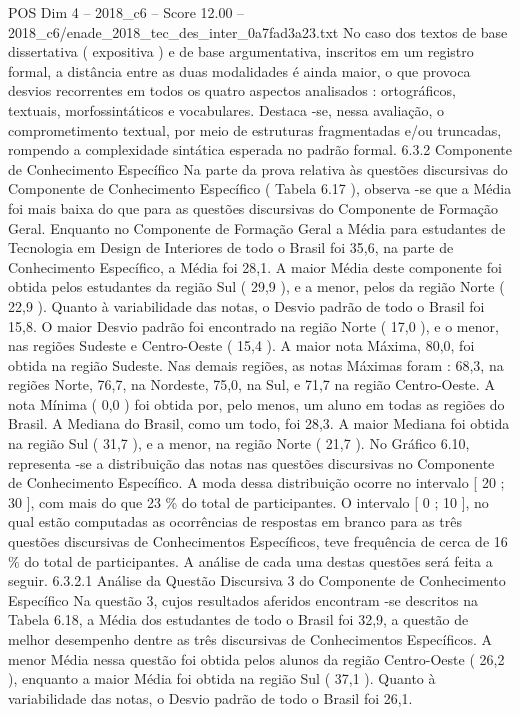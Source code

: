 \begin{textsample}{POS Dim 4 – 2018\_c6 – Score 12.00 – 2018\_c6/enade\_2018\_tec\_des\_inter\_0a7fad3a23.txt}
No caso dos textos de base dissertativa ( expositiva ) e de base argumentativa, inscritos em um registro formal, a distância entre as duas modalidades é ainda maior, o que provoca desvios recorrentes em todos os quatro aspectos analisados : ortográficos, textuais, morfossintáticos e vocabulares.
Destaca -se, nessa avaliação, o comprometimento textual, por meio de estruturas fragmentadas e/ou truncadas, rompendo a complexidade sintática esperada no padrão formal. 6.3.2 Componente de Conhecimento Específico Na parte da prova relativa às questões discursivas do Componente de Conhecimento Específico ( Tabela 6.17 ), observa -se que a Média foi mais baixa do que para as questões discursivas do Componente de Formação Geral.
Enquanto no Componente de Formação Geral a Média para estudantes de Tecnologia em Design de Interiores de todo o Brasil foi 35,6, na parte de Conhecimento Específico, a Média foi 28,1.
A maior Média deste componente foi obtida pelos estudantes da região Sul ( 29,9 ), e a menor, pelos da região Norte ( 22,9 ).
Quanto à variabilidade das notas, o Desvio padrão de todo o Brasil foi 15,8.
O maior Desvio padrão foi encontrado na região Norte ( 17,0 ), e o menor, nas regiões Sudeste e Centro-Oeste ( 15,4 ).
A maior nota Máxima, 80,0, foi obtida na região Sudeste.
Nas demais regiões, as notas Máximas foram : 68,3, na regiões Norte, 76,7, na Nordeste, 75,0, na Sul, e 71,7 na região Centro-Oeste.
A nota Mínima ( 0,0 ) foi obtida por, pelo menos, um aluno em todas as regiões do Brasil.
A Mediana do Brasil, como um todo, foi 28,3.
A maior Mediana foi obtida na região Sul ( 31,7 ), e a menor, na região Norte ( 21,7 ).
No Gráfico 6.10, representa -se a distribuição das notas nas questões discursivas no Componente de Conhecimento Específico.
A moda dessa distribuição ocorre no intervalo [ 20 ; 30 ], com mais do que 23 \% do total de participantes.
O intervalo [ 0 ; 10 ], no qual estão computadas as ocorrências de respostas em branco para as três questões discursivas de Conhecimentos Específicos, teve frequência de cerca de 16 \% do total de participantes.
A análise de cada uma destas questões será feita a seguir. 6.3.2.1 Análise da Questão Discursiva 3 do Componente de Conhecimento Específico Na questão 3, cujos resultados aferidos encontram -se descritos na Tabela 6.18, a Média dos estudantes de todo o Brasil foi 32,9, a questão de melhor desempenho dentre as três discursivas de Conhecimentos Específicos.
A menor Média nessa questão foi obtida pelos alunos da região Centro-Oeste ( 26,2 ), enquanto a maior Média foi obtida na região Sul ( 37,1 ).
Quanto à variabilidade das notas, o Desvio padrão de todo o Brasil foi 26,1.

\end{textsample}
